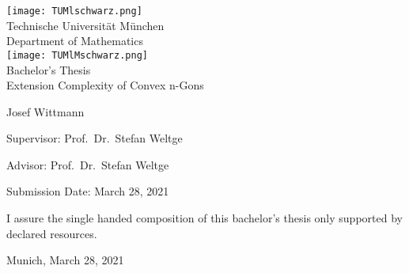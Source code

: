 \begin{titlepage}
  \begin{center}
    \texttt{[image: TUMlschwarz.png]}\\[3mm]
    \sf
    {\Large
      Technische Universität München\\[5mm]
      Department of Mathematics\\[8mm]
    }
    \normalsize
    \texttt{[image: TUMlMschwarz.png]}\\[15mm]

    Bachelor's Thesis\\[15mm]

    {\Huge
    Extension Complexity of Convex n-Gons
    }
    \bigskip

    \normalsize

    Josef Wittmann
  \end{center}
  \vspace*{75mm}

  Supervisor: Prof.\ Dr.\ Stefan Weltge
  \medskip

  Advisor: Prof.\ Dr.\ Stefan Weltge
  \medskip

  Submission Date: March 28, 2021

\end{titlepage}

\vspace*{150mm}

I assure the single handed composition of this bachelor's thesis only supported by declared resources.
\bigskip

Munich, March 28, 2021
\newpage
